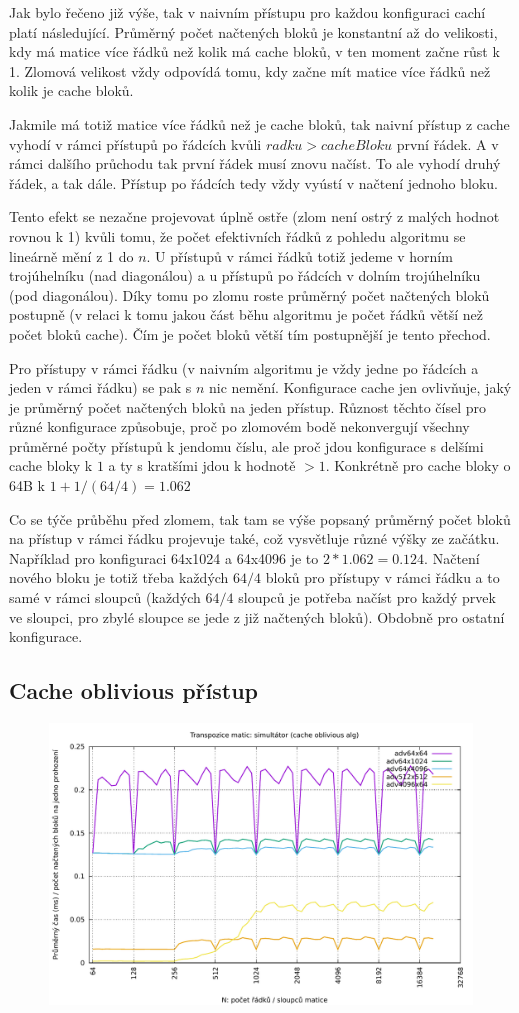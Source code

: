 \documentclass[12pt,a4paper]{report}
\begin{document}
	Jak bylo řečeno již výše, tak v naivním přístupu pro každou konfiguraci cachí platí následující. Průměrný počet načtených bloků je konstantní až do velikosti, kdy má matice více řádků než kolik má cache bloků, v ten moment začne růst k 1. Zlomová velikost vždy odpovídá tomu, kdy začne mít matice více řádků než kolik je cache bloků. 
	
	Jakmile má totiž matice více řádků než je cache bloků, tak naivní přístup z cache vyhodí v rámci přístupů po řádcích kvůli $radku > cacheBloku$ první řádek. A v rámci dalšího průchodu tak první řádek musí znovu načíst. To ale vyhodí druhý řádek, a tak dále. Přístup po řádcích tedy vždy vyústí v načtení jednoho bloku.
	
	Tento efekt se nezačne projevovat úplně ostře (zlom není ostrý z malých hodnot rovnou k 1) kvůli tomu, že počet efektivních řádků z pohledu algoritmu se lineárně mění z 1 do $n$. U přístupů v rámci řádků totiž jedeme v horním trojúhelníku (nad diagonálou) a u přístupů po řádcích v dolním trojúhelníku (pod diagonálou). Díky tomu po zlomu roste průměrný počet načtených bloků postupně (v relaci k tomu jakou část běhu algoritmu je počet řádků větší než počet bloků cache). Čím je počet bloků větší tím postupnější je tento přechod.

	Pro přístupy v rámci řádku (v naivním algoritmu je vždy jedne po řádcích a jeden v rámci řádku) se pak s $n$ nic nemění. Konfigurace cache jen ovlivňuje, jaký je průměrný počet načtených bloků na jeden přístup. Různost těchto čísel pro různé konfigurace způsobuje, proč po zlomovém bodě nekonvergují všechny průměrné počty přístupů k jendomu číslu, ale proč jdou konfigurace s delšími cache bloky k $1$ a ty s kratšími jdou k hodnotě $> 1$. Konkrétně pro cache bloky o 64B k $1 + 1/(64 / 4) = 1.062$
		
	Co se týče průběhu před zlomem, tak tam se výše popsaný průměrný počet bloků na přístup v rámci řádku projevuje také, což vysvětluje různé výšky ze začátku. Například pro konfiguraci 64x1024 a 64x4096 je to $2 * 1.062 = 0.124$. Načtení nového bloku je totiž třeba každých $64 / 4$ bloků pro přístupy v rámci řádku a to samé v rámci sloupců (každých $64 / 4$ sloupců je potřeba načíst pro každý prvek ve sloupci, pro zbylé sloupce se jede z již načtených bloků). Obdobně pro ostatní konfigurace.


	\subsection{Cache oblivious přístup}
	
		\begin{figure}[h]	
		\centering	
		\includegraphics[scale=0.6]{graph_2_adv}		
	\end{figure}
\end{document}
